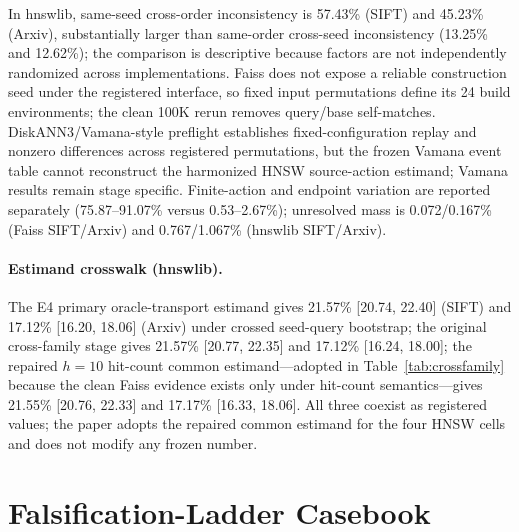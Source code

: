 \documentclass{article}
\begin{document}
In hnswlib, same-seed cross-order inconsistency is 57.43\% (SIFT) and 45.23\% (Arxiv), substantially larger
than same-order cross-seed inconsistency (13.25\% and 12.62\%); the comparison is descriptive because
factors are not independently randomized across implementations. Faiss does not expose a reliable
construction seed under the registered interface, so fixed input permutations define its 24 build
environments; the clean 100K rerun removes query/base self-matches. DiskANN3/Vamana-style preflight
establishes fixed-configuration replay and nonzero differences across registered permutations, but the
frozen Vamana event table cannot reconstruct the harmonized HNSW source-action estimand; Vamana results
remain stage specific. Finite-action and endpoint variation are reported separately (75.87--91.07\% versus
0.53--2.67\%); unresolved mass is 0.072/0.167\% (Faiss SIFT/Arxiv) and 0.767/1.067\% (hnswlib SIFT/Arxiv).

\paragraph{Estimand crosswalk (hnswlib).}
The E4 primary oracle-transport estimand gives 21.57\% [20.74, 22.40] (SIFT) and 17.12\% [16.20, 18.06]
(Arxiv) under crossed seed-query bootstrap; the original cross-family stage gives 21.57\% [20.77, 22.35]
and 17.12\% [16.24, 18.00]; the repaired $h{=}10$ hit-count common estimand---adopted in
Table~\ref{tab:crossfamily} because the clean Faiss evidence exists only under hit-count semantics---gives
21.55\% [20.76, 22.33] and 17.17\% [16.33, 18.06]. All three coexist as registered values; the paper adopts
the repaired common estimand for the four HNSW cells and does not modify any frozen number.

\section{Falsification-Ladder Casebook}
\label{app:ladder}
\end{document}
